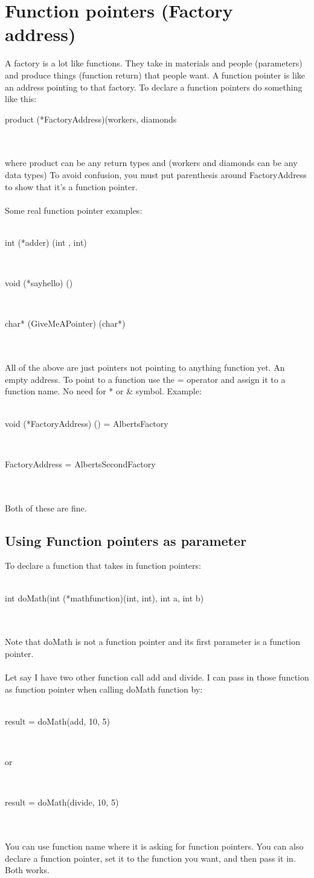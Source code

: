 \documentclass[a4paper]{article}
\begin{document}
\section{Function pointers (Factory address)}
A factory is a lot like functions. They take in materials and people (parameters) and produce things (function return) that people want. A function pointer is like an address pointing to that factory. To declare a function pointers do something like this:\\
\centerline{product (*FactoryAddress)(workers, diamonds}\\
\\
where product can be any return types and (workers and diamonds can be any data types) To avoid confusion, you must put parenthesis around FactoryAddress to show that it's a function pointer. 
\\\\
Some real function pointer examples:\\\\
\centerline{int (*adder) (int , int)}\\
\centerline{void (*sayhello) ()}\\
\centerline{char* (GiveMeAPointer) (char*)}\\
\\
All of the above are just pointers not pointing to anything function yet. An empty address. To point to a function use the = operator and assign it to a function name. No need for * or \& symbol. Example:\\
\\
\centerline{void (*FactoryAddress) () = AlbertsFactory}\\
\centerline{FactoryAddress = AlbertsSecondFactory}\\\\
Both of these are fine.
\\
\subsection{Using Function pointers as parameter}
To declare a function that takes in function pointers:\\
\\
\centerline{int doMath(int (*mathfunction)(int, int), int a, int b)}
\\\\
Note that doMath is not a function pointer and its first parameter is a function pointer.\\
\\
Let say I have two other function call add and divide. I can pass in those function as function pointer when calling doMath function by:\\
\\
\centerline{result = doMath(add, 10, 5) } \\
\centerline{or}\\
\centerline{result = doMath(divide, 10, 5)}\\
\\
You can use function name where it is asking for function pointers. You can also declare a function pointer, set it to the function you want, and then pass it in. Both works. 
\end{document}

